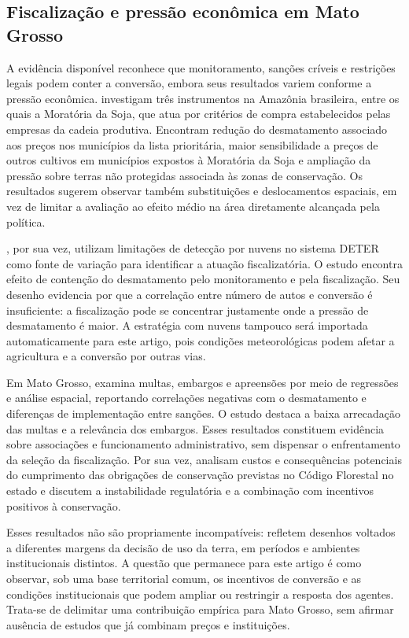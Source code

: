 \subsection{Fiscalização e pressão econômica em Mato Grosso}

A evidência disponível reconhece que monitoramento, sanções críveis e restrições legais podem conter a conversão, embora seus resultados variem conforme a pressão econômica.  investigam três instrumentos na Amazônia brasileira, entre os quais a Moratória da Soja, que atua por critérios de compra estabelecidos pelas empresas da cadeia produtiva. Encontram redução do desmatamento associado aos preços nos municípios da lista prioritária, maior sensibilidade a preços de outros cultivos em municípios expostos à Moratória da Soja e ampliação da pressão sobre terras não protegidas associada às zonas de conservação. Os resultados sugerem observar também substituições e deslocamentos espaciais, em vez de limitar a avaliação ao efeito médio na área diretamente alcançada pela política.

, por sua vez, utilizam limitações de detecção por nuvens no sistema DETER como fonte de variação para identificar a atuação fiscalizatória. O estudo encontra efeito de contenção do desmatamento pelo monitoramento e pela fiscalização. Seu desenho evidencia por que a correlação entre número de autos e conversão é insuficiente: a fiscalização pode se concentrar justamente onde a pressão de desmatamento é maior. A estratégia com nuvens tampouco será importada automaticamente para este artigo, pois condições meteorológicas podem afetar a agricultura e a conversão por outras vias.

Em Mato Grosso,  examina multas, embargos e apreensões por meio de regressões e análise espacial, reportando correlações negativas com o desmatamento e diferenças de implementação entre sanções. O estudo destaca a baixa arrecadação das multas e a relevância dos embargos. Esses resultados constituem evidência sobre associações e funcionamento administrativo, sem dispensar o enfrentamento da seleção da fiscalização. Por sua vez,  analisam custos e consequências potenciais do cumprimento das obrigações de conservação previstas no Código Florestal no estado e discutem a instabilidade regulatória e a combinação com incentivos positivos à conservação.

Esses resultados não são propriamente incompatíveis: refletem desenhos voltados a diferentes margens da decisão de uso da terra, em períodos e ambientes institucionais distintos. A questão que permanece para este artigo é como observar, sob uma base territorial comum, os incentivos de conversão e as condições institucionais que podem ampliar ou restringir a resposta dos agentes. Trata-se de delimitar uma contribuição empírica para Mato Grosso, sem afirmar ausência de estudos que já combinam preços e instituições.

